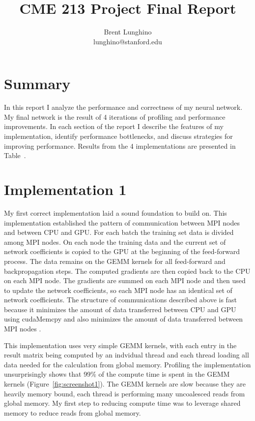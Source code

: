 \documentclass[12pt]{article}
\title{CME 213 Project Final Report}
\author{Brent Lunghino\\lunghino@stanford.edu}
\begin{document}
	
\maketitle

\section{Summary}

In this report I analyze the performance and correctness of my neural network. My final network is the result of 4 iterations of profiling and performance improvements. In each section of the report I describe the features of my implementation, identify performance bottlenecks, and discuss strategies for improving performance. Results from the 4 implementations are presented in Table~.



\section{Implementation 1}

My first correct implementation laid a sound foundation to build on. This implementation established the pattern of communication between MPI nodes and between CPU and GPU. For each batch the training set data is divided among MPI nodes. On each node the training data and the current set of network coefficients is copied to the GPU at the beginning of the feed-forward process. The data remains on the GEMM kernels for all feed-forward and backpropagation steps. The computed gradients are then copied back to the CPU on each MPI node. The gradients are summed on each MPI node and then used to update the network coefficients, so each MPI node has an identical set of network coefficients. The structure of communications described above is fast because it minimizes the amount of data transferred between CPU and GPU using cudaMemcpy and also minimizes the amount of data transferred between MPI nodes .

This implementation uses very simple GEMM kernels, with each entry in the result matrix being computed by an indvidual thread and each thread loading all data needed for the calculation from global memory. Profiling the implementation unsurprisingly shows that 99\% of the compute time is spent in the GEMM kernels (Figure~\ref{fig:screenshot1}). The GEMM kernels are slow because they are heavily memory bound, each thread is performing many uncoalesced reads from global memory. My first step to reducing compute time was to leverage shared memory to reduce reads from global memory.
\end{document}
